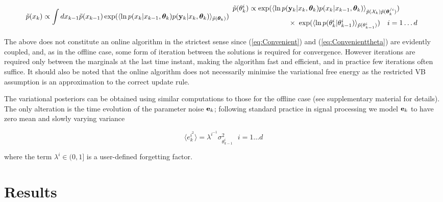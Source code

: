 \documentclass{article}
\begin{document}
\begin{subequations}

\begin{equation} \label{eq:Convenient} \pt(x_k) \propto\displaystyle\int{ dx_{k-1}}
	\pt(x_{k-1})\exp(\langle\ln p(x_k| x_{k-1},\thetab_k)p(\yk |
	x_k,\thetab_k)\rangle_{\pt(\thetab_k)}) \end{equation}

\begin{equation} \label{eq:Convenienttheta} \begin{array}{l} \pt(\theta^i_k)\propto\exp(\langle \ln
	p(\yk|x_k,\thetab_k) p(x_k|x_{k-1},\thetab_k)\rangle_{\pt(\Xk)\pt(\thetab_k^{/i})})  \\
	[2ex] ~~~~~~~~~~~~~~~~~~~~~~~~ \times~ \exp(\langle\ln
	p(\theta^i_k|\theta^i_{k-1})\rangle_{\pt(\theta^i_{k-1})}) ~~~ i = 1 \dots d
\end{array} \end{equation}


\end{subequations}


The above does not constitute an online algorithm in the strictest sense since (\ref{eq:Convenient})
and (\ref{eq:Convenienttheta}) are evidently coupled, and, as in the offline case, some form of
iteration between the solutions is required for convergence. However iterations are required only
between the marginals at the last time instant, making the algorithm fast and efficient, and in
practice few iterations often suffice. It should also be noted that the online algorithm does not
necessarily minimise the variational free energy as the restricted VB assumption is an approximation
to the correct update rule.

The variational posteriors can be obtained using similar computations to those for the offline case
(see supplementary material for details). The only alteration is the time evolution of the parameter
noise ${\bf e}_k$; following standard practice in signal processing \cite{Haykin_2001} we model ${\bf e}_k$ to
have zero mean and slowly varying variance

\begin{equation} \langle e^{i^2}_k \rangle = \lambda^{i^{-1}}\sigma^2_{\theta^{i}_{k-1}}  ~~~ i = 1 \dots d \end{equation}

\noindent where the term $\lambda^i \in (0,1]$ is a user-defined forgetting factor.

\section{Results}
\end{document}
